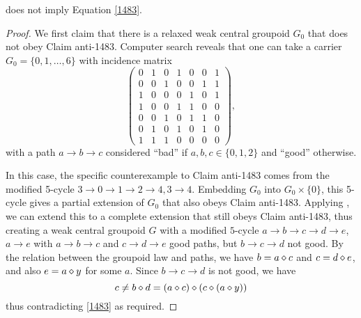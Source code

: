 \begin{theorem}\label{1485-not-1483}   does not imply Equation \eqref{1483}.
\end{theorem}

\begin{proof}  We first claim that there is a relaxed weak central groupoid $G_0$ that does not obey Claim anti-1483.  Computer search reveals that one can take a carrier $G_0=\{0,1,\dots,6\}$ with incidence matrix
$$
\begin{pmatrix}
  0 & 1 & 0 & 1 & 0 & 0 & 1 \\
  0 & 0 & 1 & 0 & 0 & 1 & 1\\
  1 & 0 & 0 & 0 & 1 & 0 & 1\\
  1 & 0 & 0 & 1 & 1 & 0 & 0\\
  0 & 0 & 1 & 0 & 1 & 1 & 0\\
  0 & 1 & 0 & 1 & 0 & 1 & 0\\
  1 & 1 & 1 & 0 & 0 & 0 & 0
\end{pmatrix},
$$
with a path $a \to b \to c$ considered ``bad'' if $a,b,c \in \{0,1,2\}$ and ``good'' otherwise.


In this case, the specific counterexample to Claim anti-1483 comes from the modified 5-cycle $3 \to 0 \to 1 \to 2 \to 4, 3 \to 4$.  Embedding $G_0$ into $G_0 \times \{0\}$, this 5-cycle gives a partial extension of $G_0$ that also obeys Claim anti-1483.  Applying , we can extend this to a complete extension that still obeys Claim anti-1483, thus creating a weak central groupoid $G$ with a modified $5$-cycle $a \to b \to c \to d \to e$, $a \to e$ with $a \to b \to c$ and $c \to d \to e$ good paths, but $b \to c \to d$ not good.  By the relation between the groupoid law and paths, we have $b = a \diamond c$ and $c = d \diamond e$, and also
$e = a \diamond y$ for some $a$.  Since $b \to c \to d$ is not good, we have
$$ c \neq b \diamond d = (a \diamond c) \diamond (c \diamond (a \diamond y))$$
thus contradicting \eqref{1483} as required.
\end{proof}

